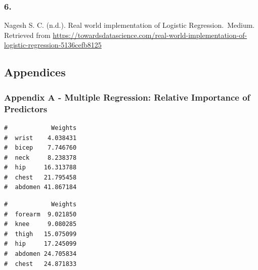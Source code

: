 \documentclass[a4paper,9pt,twocolumn,twoside,]{pinp}
\begin{document}
\hypertarget{section-5}{%
\subsubsection{6.}\label{section-5}}

Nagesh S. C. (n.d.). Real world implementation of Logistic
Regression.~Medium. Retrieved from
\url{https://towardsdatascience.com/real-world-implementation-of-logistic-regression-5136cefb8125}

\hypertarget{appendices}{%
\subsection{Appendices}\label{appendices}}

\hypertarget{appendix-a---multiple-regression-relative-importance-of-predictors}{%
\subsubsection{Appendix A - Multiple Regression: Relative Importance of
Predictors}\label{appendix-a---multiple-regression-relative-importance-of-predictors}}

\begin{ShadedResult}
\begin{verbatim}
#            Weights
#  wrist    4.038431
#  bicep    7.746760
#  neck     8.238378
#  hip     16.313788
#  chest   21.795458
#  abdomen 41.867184
\end{verbatim}
\end{ShadedResult}
\begin{ShadedResult}
\begin{verbatim}
#            Weights
#  forearm  9.021850
#  knee     9.080285
#  thigh   15.075099
#  hip     17.245099
#  abdomen 24.705834
#  chest   24.871833
\end{verbatim}
\end{ShadedResult}
\end{document}
